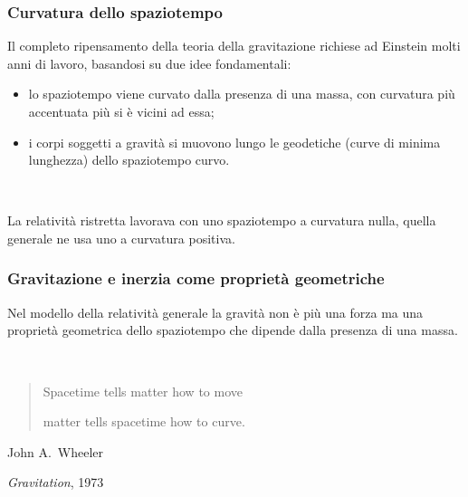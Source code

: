 \documentclass[]{beamer}
\theoremstyle{plain}
\begin{document}
\begin{frame}
\frametitle{Curvatura dello spaziotempo}
Il completo ripensamento della teoria della gravitazione richiese ad Einstein molti anni di lavoro, basandosi su due idee fondamentali:
\begin{itemize}
  \item lo \alert<1>{spaziotempo viene curvato dalla presenza di una massa}, con curvatura più accentuata più si è vicini ad essa;\pause
  \item \alert<2>{i corpi soggetti a gravità si muovono lungo le geodetiche} (curve di minima lunghezza) dello spaziotempo curvo.\pause
\end{itemize}

~

La relatività ristretta lavorava con uno spaziotempo a curvatura nulla, quella generale ne usa uno a curvatura positiva.
\begin{center}
\href{https://drive.google.com/open?id=1kI_uxzUEqqL2lPvsBEERMYCoG-gnTHZq}{}
\end{center}
\end{frame}

\begin{frame}
\frametitle{Gravitazione e inerzia come proprietà geometriche}
Nel modello della relatività generale la gravità non è più una forza ma una \alert{proprietà geometrica dello spaziotempo} che dipende dalla presenza di una massa.

~
\begin{flushright}

\begin{quote}
Spacetime tells matter how to move

matter tells spacetime how to curve.  
\end{quote}
John A.~Wheeler

\emph{Gravitation}, 1973
\end{flushright}
\end{frame}
\end{document}
